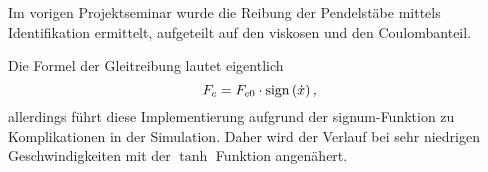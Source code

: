 Im vorigen Projektseminar \cite{ribeiro} wurde die Reibung der Pendelstäbe mittels Identifikation ermittelt, aufgeteilt auf den viskosen und den Coulombanteil.

Die Formel der Gleitreibung lautet eigentlich 
	\[
	F_c = F_{c0}  \cdot  \mathrm{sign}\left(\dot{x}\right) ,
\]
allerdings führt diese Implementierung aufgrund der signum-Funktion zu Komplikationen in der Simulation. Daher wird der Verlauf bei sehr niedrigen Geschwindigkeiten mit der $\tanh$ Funktion angenähert.

